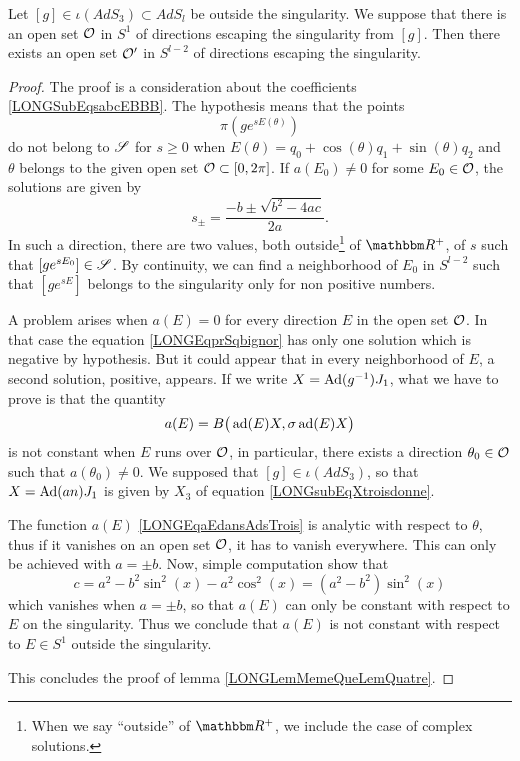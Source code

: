 %
\begin{lemma}		\label{LONGLemMemeQueLemQuatre}
	Let $[g]\in\iota(AdS_3)\subset AdS_l$ be outside the singularity. We suppose that there is an open set $\mathcal{O}$ in $S^1$ of directions escaping the singularity from $[g]$. Then there exists an open set $\mathcal{O}'$ in $S^{l-2}$ of directions escaping the singularity.
\end{lemma}

\begin{proof}
	The proof is a consideration about the coefficients \eqref{LONGSubEqsabcEBBB}. The hypothesis means that the points
\begin{equation}
	\pi\left( g e^{sE(\theta)} \right)
\end{equation}
do not belong to $\mathscr{S}$ for $s\geq 0$ when $E(\theta)=q_0+\cos(\theta)q_1+\sin(\theta)q_2$ and $\theta$ belongs to the given open set $\mathcal{O}\subset\mathopen[ 0 , 2\pi \mathclose]$. If $a(E_0)\neq 0$ for some $E_0\in\mathcal{O}$, the solutions are given by
\begin{equation}
	s_{\pm}=\frac{ -b\pm\sqrt{b^2-4ac} }{ 2a }.
\end{equation}
In such a direction, there are two values, both outside\footnote{When we say ``outside'' of $\eR^+$, we include the case of complex solutions.} of $\eR^+$, of $s$ such that $[g e^{sE_0}]\in \mathscr{S}$. By continuity, we can find a neighborhood of $E_0$ in $S^{l-2}$ such that $[g e^{sE}]$ belongs to the singularity only for non positive numbers.

A problem arises when $a(E)=0$ for every direction $E$ in the open set $\mathcal{O}$. In that case the equation \eqref{LONGEqprSqbignor} has only one solution which is negative by hypothesis. But it could appear that in every neighborhood of $E$, a second solution, positive, appears. If we write $X=\operatorname{Ad}(g^{-1})J_1$, what we have to prove is that the quantity
\begin{equation}
	a(E)=B\big( \operatorname{ad}(E)X,\sigma\operatorname{ad}(E)X \big)
\end{equation}
is not constant when $E$ runs over $\mathcal{O}$, in particular, there exists a direction $\theta_0\in\mathcal{O}$ such that $a(\theta_0)\neq 0$. We supposed that $[g]\in \iota(AdS_3)$, so that $X=\operatorname{Ad}(an)J_1$ is given by $X_3$ of equation \eqref{LONGsubEqXtroisdonne}.


The function $a(E)$ \eqref{LONGEqaEdansAdsTrois} is analytic with respect to $\theta$, thus if it vanishes on an open set $\mathcal{O}$, it has to vanish everywhere. This can only be achieved with $a=\pm b$. Now, simple computation show that
\begin{equation}
	c=a^2-b^2\sin^2(x)-a^2\cos^2(x)=(a^2-b^2)\sin^2(x)
\end{equation}
which vanishes when $a=\pm b$, so that $a(E)$ can only be constant with respect to $E$ on the singularity. Thus we conclude that $a(E)$ is not constant with respect to $E\in S^1$ outside the singularity.

This concludes the proof of lemma \ref{LONGLemMemeQueLemQuatre}.
\end{proof}
%

